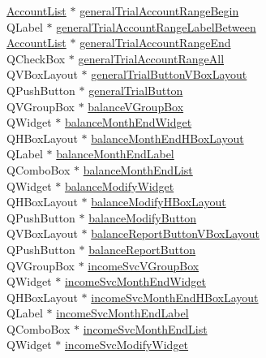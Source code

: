 \begin{CompactItemize}
\begin{tabbing}
\>\hyperlink{classAccountList}{AccountList} $\ast$ \hyperlink{classReportStack_r41}{generalTrialAccountRangeBegin}\\
\>QLabel $\ast$ \hyperlink{classReportStack_r42}{generalTrialAccountRangeLabelBetween}\\
\>\hyperlink{classAccountList}{AccountList} $\ast$ \hyperlink{classReportStack_r43}{generalTrialAccountRangeEnd}\\
\>QCheckBox $\ast$ \hyperlink{classReportStack_r44}{generalTrialAccountRangeAll}\\
\>QVBoxLayout $\ast$ \hyperlink{classReportStack_r45}{generalTrialButtonVBoxLayout}\\
\>QPushButton $\ast$ \hyperlink{classReportStack_r46}{generalTrialButton}\\
\>QVGroupBox $\ast$ \hyperlink{classReportStack_r47}{balanceVGroupBox}\\
\>QWidget $\ast$ \hyperlink{classReportStack_r48}{balanceMonthEndWidget}\\
\>QHBoxLayout $\ast$ \hyperlink{classReportStack_r49}{balanceMonthEndHBoxLayout}\\
\>QLabel $\ast$ \hyperlink{classReportStack_r50}{balanceMonthEndLabel}\\
\>QComboBox $\ast$ \hyperlink{classReportStack_r51}{balanceMonthEndList}\\
\>QWidget $\ast$ \hyperlink{classReportStack_r52}{balanceModifyWidget}\\
\>QHBoxLayout $\ast$ \hyperlink{classReportStack_r53}{balanceModifyHBoxLayout}\\
\>QPushButton $\ast$ \hyperlink{classReportStack_r54}{balanceModifyButton}\\
\>QVBoxLayout $\ast$ \hyperlink{classReportStack_r55}{balanceReportButtonVBoxLayout}\\
\>QPushButton $\ast$ \hyperlink{classReportStack_r56}{balanceReportButton}\\
\>QVGroupBox $\ast$ \hyperlink{classReportStack_r57}{incomeSvcVGroupBox}\\
\>QWidget $\ast$ \hyperlink{classReportStack_r58}{incomeSvcMonthEndWidget}\\
\>QHBoxLayout $\ast$ \hyperlink{classReportStack_r59}{incomeSvcMonthEndHBoxLayout}\\
\>QLabel $\ast$ \hyperlink{classReportStack_r60}{incomeSvcMonthEndLabel}\\
\>QComboBox $\ast$ \hyperlink{classReportStack_r61}{incomeSvcMonthEndList}\\
\>QWidget $\ast$ \hyperlink{classReportStack_r62}{incomeSvcModifyWidget}\\

\end{tabbing}
\end{CompactItemize}

